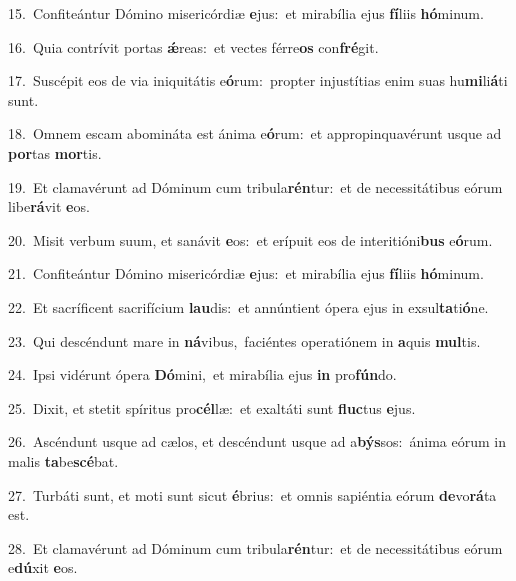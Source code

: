 {\numbfont\textcolor{\numbcolor}{15.}}~Confiteántur Dómino misericórdiæ \textbf{e}\-jus:~\star et mirabília ejus \textbf{fí}\-liis \textbf{hó}\-minum.\par
{\numbfont\textcolor{\numbcolor}{16.}}~Quia contrívit portas \textbf{ǽ}\-reas:~\star et vectes férre\textbf{os} con\-\textbf{fré}\-git.\par
{\numbfont\textcolor{\numbcolor}{17.}}~Suscépit eos de via iniquitátis e\-\textbf{ó}\-rum:~\star propter injustítias enim suas hu\-\textbf{mi}\-li\-\textbf{á}\-ti sunt.\par
{\numbfont\textcolor{\numbcolor}{18.}}~Omnem escam abomináta est ánima e\-\textbf{ó}\-rum:~\star et appropinquavérunt usque ad \textbf{por}\-tas \textbf{mor}\-tis.\par
{\numbfont\textcolor{\numbcolor}{19.}}~Et clamavérunt ad Dóminum cum tribula\-\textbf{rén}\-tur:~\star et de necessitátibus eórum libe\-\textbf{rá}\-vit \textbf{e}\-os.\par
{\numbfont\textcolor{\numbcolor}{20.}}~Misit verbum suum, et sanávit \textbf{e}\-os:~\star et erípuit eos de interitióni\textbf{bus} e\-\textbf{ó}\-rum.\par
{\numbfont\textcolor{\numbcolor}{21.}}~Confiteántur Dómino misericórdiæ \textbf{e}\-jus:~\star et mirabília ejus \textbf{fí}\-liis \textbf{hó}\-minum.\par
{\numbfont\textcolor{\numbcolor}{22.}}~Et sacríficent sacrifícium \textbf{lau}\-dis:~\star et annúntient ópera ejus in exsul\-\textbf{ta}\-ti\-\textbf{ó}\-ne.\par
{\numbfont\textcolor{\numbcolor}{23.}}~Qui descéndunt mare in \textbf{ná}\-vibus,~\star faciéntes operatiónem in \textbf{a}\-quis \textbf{mul}\-tis.\par
{\numbfont\textcolor{\numbcolor}{24.}}~Ipsi vidérunt ópera \textbf{Dó}\-mini,~\star et mirabília ejus \textbf{in} pro\-\textbf{fún}\-do.\par
{\numbfont\textcolor{\numbcolor}{25.}}~Dixit, et stetit spíritus pro\-\textbf{cél}\-læ:~\star et exaltáti sunt \textbf{fluc}\-tus \textbf{e}\-jus.\par
{\numbfont\textcolor{\numbcolor}{26.}}~Ascéndunt usque ad cælos, et descéndunt usque ad a\-\textbf{býs}\-sos:~\star ánima eórum in malis \textbf{ta}\-be\-\textbf{scé}\-bat.\par
{\numbfont\textcolor{\numbcolor}{27.}}~Turbáti sunt, et moti sunt sicut \textbf{é}\-brius:~\star et omnis sapiéntia eórum \textbf{de}\-vo\-\textbf{rá}\-ta est.\par
{\numbfont\textcolor{\numbcolor}{28.}}~Et clamavérunt ad Dóminum cum tribula\-\textbf{rén}\-tur:~\star et de necessitátibus eórum e\-\textbf{dú}\-xit \textbf{e}\-os.\par
